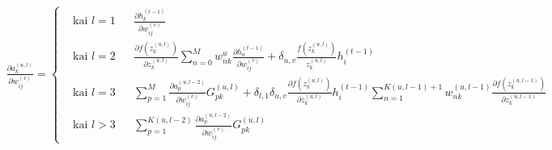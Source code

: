\begin{equation} \label{eq:gkvh}
  \begin{aligned}
    \frac{\partial a_k^{(u,l)}}{\partial w_{ij}^{(v)}} = \left \{
    \begin{aligned}
      &\text{kai } l=1 && \frac{\partial h_k^{(t-1)}}{\partial w_{ij}^{(v)}}\\
      &\text{kai } l=2 && \frac{\partial f(z_k^{(u,l)})}{\partial z_k^{(u,l)}}\sum_{n=0}^M w_{nk}^u \frac{\partial h_n^{(t-1)}}{\partial w_{ij}^{(v)}} +
      \delta_{u,v}\frac{f(z_k^{(u,l)})}{z_k^{(u,l)}}h_i^{(t-1)}\\
      &\text{kai } l=3 && \sum_{p=1}^{M}
      \frac{\partial a_p^{(u,l-2)}}{\partial w_{ij}^{(v)}}G_{pk}^{(u,l)} +
      \delta_{l,1}\delta_{u,v}\frac{\partial f(z_k^{(u,l)})}{\partial z_k^{(u,l)}}h_i^{(t-1)}\sum_{n=1}^{K(u,l-1)+1} w_{nk}^{(u,l-1)}\frac{\partial f(z_k^{(u,l-1)})}{\partial z_k^{(u,l-1)}}\\
      &\text{kai } l>3 && \sum_{p=1}^{K(u,l-2)}
      \frac{\partial a_p^{(u,l-2)}}{\partial w_{ij}^{(v)}}G_{pk}^{(u,l)}
    \end{aligned}
    \right.
  \end{aligned}
\end{equation}
%
%

%
%

%
%

%
%

%
%
